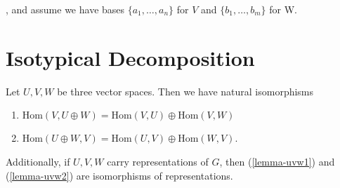 , and assume we have bases $\{ a_1, \ldots, a_n\}$ for $V$  and $\{b_1, \ldots, b_m \}$ for W.
\section{Isotypical Decomposition}

\begin{lemma}\label{lemma-uvw}
Let $U, V, W$ be three vector spaces.  Then we have natural isomorphisms
\begin{enumerate}
\item \label{lemma-uvw1} $\text{Hom} (V, U \oplus W) = \text{Hom} (V,U) \oplus \text{Hom} (V,W)$
\item \label{lemma-uvw2} $\text{Hom} (U \oplus W, V) = \text{Hom} (U,V) \oplus \text{Hom} (W,V)$.
\end{enumerate}
Additionally, if $U,V,W$ carry representations of $G$, then (\ref{lemma-uvw1}) and (\ref{lemma-uvw2}) are isomorphisms of representations.
\end{lemma}
